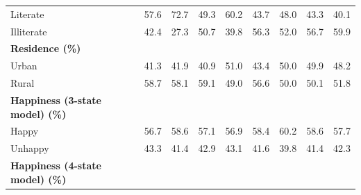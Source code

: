 \documentclass[12pt, a4paper]{article}
\begin{document}
\begin{appendices}
\begin{table}[!h]
{\begin{tabular}{lcccccccc}
        \quad Literate     & 57.6                                & 72.7                                & 49.3                                & 60.2                                & 43.7              & 48.0              & 43.3              & 40.1              \\
        \quad Illiterate   & 42.4                                & 27.3                                & 50.7                                & 39.8                                & 56.3              & 52.0              & 56.7              & 59.9              \\
        \midrule
        \textbf{Residence (\%)}                                                                                                                                                                                                                                    \\
        \quad Urban        & 41.3                                & 41.9                                & 40.9                                & 51.0                                & 43.4              & 50.0              & 49.9              & 48.2              \\
        \quad Rural        & 58.7                                & 58.1                                & 59.1                                & 49.0                                & 56.6              & 50.0              & 50.1              & 51.8              \\
        \midrule
        \textbf{Happiness (3-state model) (\%)}                                                                                                                                                                                                                    \\
        \quad Happy        & 56.7                                & 58.6                                & 57.1                                & 56.9                                & 58.4              & 60.2              & 58.6              & 57.7              \\
        \quad Unhappy      & 43.3                                & 41.4                                & 42.9                                & 43.1                                & 41.6              & 39.8              & 41.4              & 42.3              \\
        \midrule
        \textbf{Happiness (4-state model) (\%)}                                                                                                                                                                                                                    \\

\end{tabular}}
\end{table}
\end{appendices}
\end{document}

